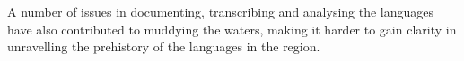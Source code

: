 \largerpage
{}
A number of issues in documenting,
transcribing and analysing the languages have also contributed
to muddying the waters,
making it harder to gain clarity in unravelling the prehistory
of the languages in the region.
